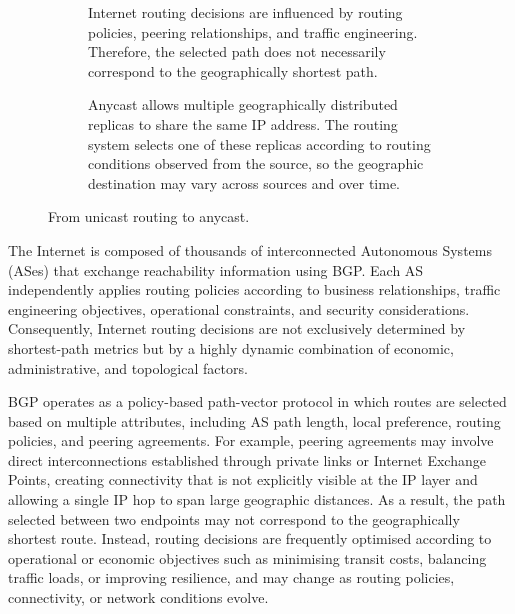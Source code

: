 \begin{figure}[t]
    \centering
 
    \begin{subfigure}[t]{0.95\textwidth}
        \centering
        \resizebox{\textwidth}{!}{%
            
        }
        \caption{Internet routing decisions are influenced by routing policies, peering relationships, and traffic engineering. Therefore, the selected path does not necessarily correspond to the geographically shortest path.}
        \label{fig:internet-routing}
    \end{subfigure}

    \vspace{8mm}

    \begin{subfigure}[t]{0.95\textwidth}
        \centering
        \resizebox{\textwidth}{!}{%
            
        }
        \caption{Anycast allows multiple geographically distributed replicas to share the same IP address. The routing system selects one of these replicas according to routing conditions observed from the source, so the geographic destination may vary across sources and over time.}
        \label{fig:anycast-routing}
    \end{subfigure}

    \caption{From unicast routing to anycast.}
    \label{fig:internet-routing-anycast}
\end{figure}

The Internet is composed of thousands of interconnected Autonomous Systems (ASes) that exchange reachability information using BGP. Each AS independently applies routing policies according to business relationships, traffic engineering objectives, operational constraints, and security considerations. Consequently, Internet routing decisions are not exclusively determined by shortest-path metrics but by a highly dynamic combination of economic, administrative, and topological factors.

BGP operates as a policy-based path-vector protocol in which routes are selected based on multiple attributes, including AS path length, local preference, routing policies, and peering agreements. For example, peering agreements may involve direct interconnections established through private links or Internet Exchange Points, creating connectivity that is not explicitly visible at the IP layer and allowing a single IP hop to span large geographic distances. As a result, the path selected between two endpoints may not correspond to the geographically shortest route. Instead, routing decisions are frequently optimised according to operational or economic objectives such as minimising transit costs, balancing traffic loads, or improving resilience, and may change as routing policies, connectivity, or network conditions evolve.

